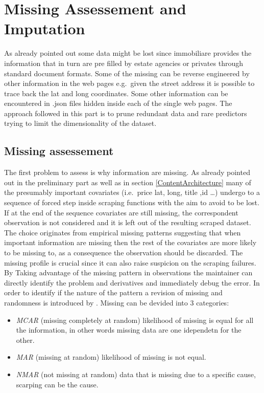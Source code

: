\documentclass[
  12pt,
  a4paper,
  oneside]{book}
\providecommand{\tightlist}{%
  \setlength{\itemsep}{0pt}\setlength{\parskip}{0pt}}
\theoremstyle{definition}
\theoremstyle{definition}
\theoremstyle{definition}
\theoremstyle{remark}
\begin{document}
\hypertarget{missing-assessement-and-imputation}{%
\section{Missing Assessement and Imputation}\label{missing-assessement-and-imputation}}

As already pointed out some data might be lost since immobiliare provides the information that in turn are pre filled by estate agencies or privates through standard document formats. Some of the missing can be reverse engineered by other information in the web pages e.g.~given the street address it is possible to trace back the lat and long coordinates. Some other information can be encountered in .json files hidden inside each of the single web pages.
The approach followed in this part is to prune redundant data and rare predictors trying to limit the dimensionality of the dataset.

\hypertarget{missing-assessement}{%
\subsection{Missing assessement}\label{missing-assessement}}

The first problem to assess is why information are missing. As already pointed out in the preliminary part as well as in section \ref{ContentArchitecture} many of the presumably important covariates (i.e.~price lat, long, title ,id \ldots) undergo to a sequence of forced step inside scraping functions with the aim to avoid to be lost. If at the end of the sequence covariates are still missing, the correspondent observation is not considered and it is left out of the resulting scraped dataset. The choice originates from empirical missing patterns suggesting that when important information are missing then the rest of the covariates are more likely to be missing to, as a consequence the observation should be discarded.
The missing profile is crucial since it can also raise suspicion on the scraping failures. By Taking advantage of the missing pattern in observations the maintainer can directly identify the problem and derivatives and immediately debug the error. In order to identify if the nature of the pattern a revision of missing and randomness is introduced by \citet{Little}.
Missing can be devided into 3 categories:

\begin{itemize}
\tightlist
\item
  \emph{MCAR} (missing completely at random) likelihood of missing is equal for all the information, in other words missing data are one idependetn for the other.
\item
  \emph{MAR} (missing at random) likelihood of missing is not equal.
\item
  \emph{NMAR} (not missing at random) data that is missing due to a specific cause, scarping can be the cause.
\end{itemize}
\end{document}
